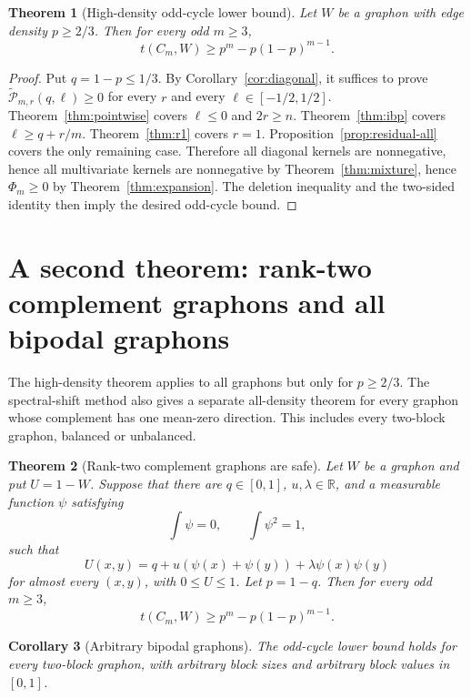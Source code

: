 \documentclass[11pt]{article}
\newtheorem{theorem}{Theorem}[section]
\newtheorem{corollary}[theorem]{Corollary}
\newcommand{\wtP}{\widetilde{\mathcal P}}
\begin{document}
\begin{theorem}[High-density odd-cycle lower bound]\label{thm:regionI-full}
Let $W$ be a graphon with edge density $p\ge2/3$.  Then for every odd $m\ge3$,
\[
        t(C_m,W)\ge p^m-p(1-p)^{m-1}.
\]
\end{theorem}

\begin{proof}
Put $q=1-p\le1/3$.  By Corollary~\ref{cor:diagonal}, it suffices to prove $\wtP_{m,r}(q,\ell)\ge0$ for every $r$ and every $\ell\in[-1/2,1/2]$.  Theorem~\ref{thm:pointwise} covers $\ell\le0$ and $2r\ge n$.  Theorem~\ref{thm:ibp} covers $\ell\ge q+r/m$.  Theorem~\ref{thm:r1} covers $r=1$.  Proposition~\ref{prop:residual-all} covers the only remaining case.  Therefore all diagonal kernels are nonnegative, hence all multivariate kernels are nonnegative by Theorem~\ref{thm:mixture}, hence $\Phi_m\ge0$ by Theorem~\ref{thm:expansion}.  The deletion inequality and the two-sided identity then imply the desired odd-cycle bound.
\end{proof}


\section{A second theorem: rank-two complement graphons and all bipodal graphons}\label{sec:ranktwo}

The high-density theorem applies to all graphons but only for $p\ge2/3$.  The spectral-shift method also gives a separate all-density theorem for every graphon whose complement has one mean-zero direction.  This includes every two-block graphon, balanced or unbalanced.

\begin{theorem}[Rank-two complement graphons are safe]\label{thm:ranktwo}
Let $W$ be a graphon and put $U=1-W$.  Suppose that there are $q\in[0,1]$, $u,\lambda\in\mathbb R$, and a measurable function $\psi$ satisfying
\[
        \int\psi=0,
        \qquad \int\psi^2=1,
\]
such that
\begin{equation}\label{eq:ranktwo-kernel-full}
        U(x,y)=q+u(\psi(x)+\psi(y))+\lambda\psi(x)\psi(y)
\end{equation}
for almost every $(x,y)$, with $0\le U\le1$.  Let $p=1-q$.  Then for every odd $m\ge3$,
\[
        t(C_m,W)\ge p^m-p(1-p)^{m-1}.
\]
\end{theorem}

\begin{corollary}[Arbitrary bipodal graphons]\label{cor:bipodal}
The odd-cycle lower bound holds for every two-block graphon, with arbitrary block sizes and arbitrary block values in $[0,1]$.
\end{corollary}
\end{document}
